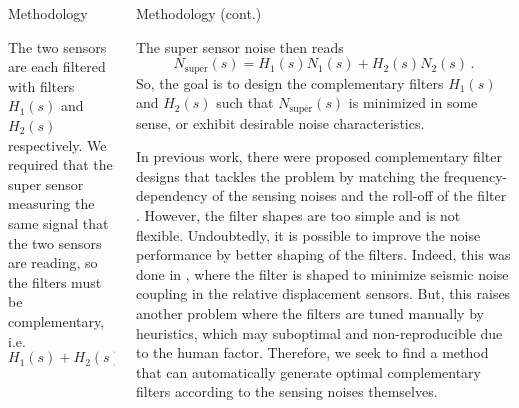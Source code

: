 \documentclass{beamer}
\begin{document}
\begin{frame}[t]
\begin{columns}[t]
\begin{column}{0.32\linewidth}
\begin{block}{Methodology}
			\medskip
			
			The two sensors are each filtered with filters $H_1(s)$ and $H_2(s)$ respectively.
			We required that the super sensor measuring the same signal that the two sensors are reading, so the filters must be complementary, i.e.
			\begin{equation}
				H_1(s) + H_2(s) = 1\,.
				\label{eqn:complementary}
			\end{equation}
			\end{block}
		\end{column}
	
		\begin{column}{0.32\linewidth}
			\begin{block}{Methodology (cont.)}
				
				The super sensor noise then reads
				\begin{equation}
					N_\text{super}(s) = H_1(s)N_1(s) + H_2(s)N_2(s)\,.
					\label{eqn:noise_super}
				\end{equation}
				So, the goal is to design the complementary filters $H_1(s)$ and $H_2(s)$ such that $N_\text{super}(s)$ is minimized in some sense, or exhibit desirable noise characteristics.
				
				\medskip
				
				In previous work, there were proposed complementary filter designs that tackles the problem by matching the frequency-dependency of the sensing noises and the roll-off of the filter \cite{Sekiguchi:2016bmv, vanHeijningen:2018cpc}.
				However, the filter shapes are too simple and is not flexible.
				Undoubtedly, it is possible to improve the noise performance by better shaping of the filters.
				Indeed, this was done in \cite{low_frequency_optimization_and_performance_of_advanced_virgo_seismic_isolation_system}, where the filter is shaped to minimize seismic noise coupling in the relative displacement sensors.
				But, this raises another problem where the filters are tuned manually by heuristics, which may suboptimal and non-reproducible due to the human factor.
				Therefore, we seek to find a method that can automatically generate optimal complementary filters according to the sensing noises themselves.
				
				\medskip
				

\end{block}
\end{column}
\end{columns}
\end{frame}
\end{document}
